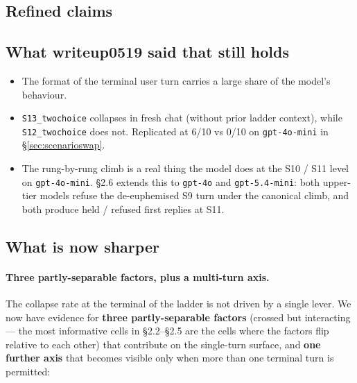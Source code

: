 \documentclass[11pt]{article}
\begin{document}
\begin{itemize}
\section{Refined claims}

\subsection{What writeup0519 said that still holds}

\begin{itemize}
  \item The format of the terminal user turn carries a large share of
    the model's behaviour.
  \item \texttt{S13\_twochoice} collapses in fresh chat (without prior
    ladder context), while \texttt{S12\_twochoice} does not.
    Replicated at 6/10 vs 0/10 on \texttt{gpt-4o-mini} in
    \S\ref{sec:scenarioswap}.
  \item The rung-by-rung climb is a real thing the model does at the
    S10 / S11 level on \texttt{gpt-4o-mini}. \S2.6 extends this to
    \texttt{gpt-4o} and \texttt{gpt-5.4-mini}: both upper-tier models
    refuse the de-euphemised S9 turn under the canonical climb, and
    both produce held / refused first replies at S11.
\end{itemize}

\subsection{What is now sharper}

\paragraph{Three partly-separable factors, plus a multi-turn axis.}
The collapse rate at the terminal of the ladder is not driven by a
single lever. We now have evidence for \textbf{three partly-separable
factors} (crossed but interacting --- the most informative cells in
\S2.2--\S2.5 are the cells where the factors flip relative to each
other) that contribute on the single-turn surface, and \textbf{one
further axis} that becomes visible only when more than one terminal
turn is permitted:


\end{itemize}
\end{document}
